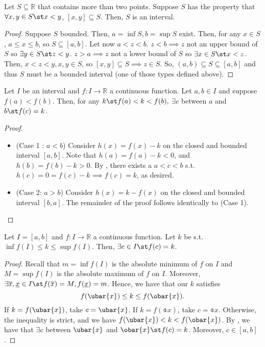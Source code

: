 \documentclass[12pt]{article}
\begin{document}
\begin{theorem}
  Let $S \subseteq \mathbb{R}$ that contains more than two points. Suppose $S$ has the property that $\forall x, y \in S \st x < y$, $[x, y] \subseteq S$. Then, $S$ is an interval.
\end{theorem}

\begin{proof}
  Suppose $S$ bounded. Then, $a = \inf S, b = \sup S$ exist. Then, for any $x \in S$, $a \leq x \leq b$, so $S \subseteq [a, b]$. Let now $a < z < b$. $z < b \implies z$ not an upper bound of $S$ so $\exists y \in S \st z < y$. $z > a \implies z$ not a lower bound of $S$ so $\exists x \in S \st x < z$. Then, $x < z < y, x,y \in S$, so $[x, y] \subseteq S \implies z \in S$. So, $(a, b) \subseteq S \subseteq [a, b]$ and thus $S$ must be a bounded interval (one of those types defined above).
\end{proof}

\begin{theorem}\label{thm:bolzanosintermediate}
  Let $I$ be an interval and $f : I \to \mathbb{R}$ a continuous function. Let $a, b\in I$ and suppose $f(a) < f(b)$. Then, for any $k \st f(a) < k < f(b),$ $\exists c$ between $a$ and $b \st f(c) = k$. 
\end{theorem}

\begin{proof}
  \begin{itemize}
    \item(Case 1 : $a < b$) Consider $h(x) = f(x) - k$ on the closed and bounded interval $[a,b]$. Note that $h(a) = f(a) - k < 0$, and $h(b) = f(b) - k > 0$. By , there exists a $a < c < b$ s.t. $h(c) = 0 = f(c) - k \implies f(c) = k$, as desired.
    \item(Case 2: $a > b$) Consider $h(x) = k - f(x)$ on the closed and bounded interval $[b, a]$. The remainder of the proof follows identically to (Case 1).
  \end{itemize}
\end{proof}

\begin{theorem}\label{thm:pseudointermediate}
  Let $I = [a, b]$ and $f: I \to \mathbb{R}$ a continuous function. Let $k$ be s.t. $\inf f(I)\leq k \leq \sup f(I)$. Then, $\exists c \in I \st f(c) = k$.
\end{theorem}

\begin{proof}
  Recall that $m = \inf f(I)$ is the absolute minimum of $f$ on $I$ and $M = \sup f(I)$ is the absolute maximum of $f$ on $I$. Moreover, $\exists \overline{x}, \underline{x} \in I \st f(\overline{x}) = M, f(\underline{x}) = m$. Hence, we have that our $k$ satisfies \[
  f(\ubar{x}) \leq k \leq f(\obar{x}).
  \]
  If $k = f(\ubar{x})$, take $c = \ubar{x}$. If $k = f(\obar{x})$, take $c = \obar{x}$. Otherwise, the inequality is strict, and we have $f(\ubar{x}) < k < f(\obar{x})$. By , we have that $\exists c$ between $\ubar{x}$ and $\obar{x} \st f(c) = k$. Moreover, $c \in [a,b]$.
\end{proof}
\end{document}
